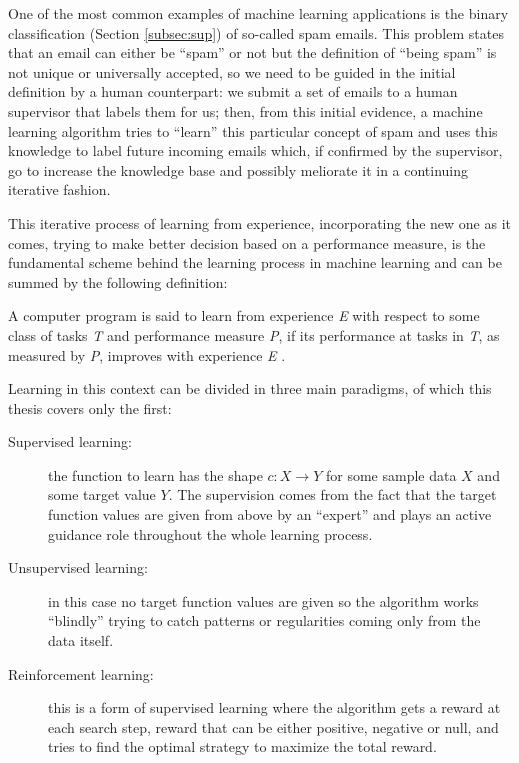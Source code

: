 One of the most common examples of machine learning applications is the binary
classification (Section \ref{subsec:sup}) of so-called spam emails.
This problem states that an email can either be ``spam'' or not but the definition
of ``being spam'' is not unique or universally accepted, so we need to be guided
in the initial definition by a human counterpart: we submit a set of emails to a
human supervisor that labels them for us; then, from this initial evidence, a
machine learning algorithm tries to ``learn'' this particular concept of spam
and uses this knowledge to label future incoming emails which, if confirmed by the
supervisor, go to increase the knowledge base and possibly meliorate it in
a continuing iterative fashion.

This iterative process of learning from experience, incorporating the new one
as it comes, trying to make better decision based on a performance measure, is
the fundamental scheme behind the learning process in machine learning and can
be summed by the following definition:

\begin{definition}[Learning]
    A computer program is said to learn from experience \emph{E} with
    respect to some class of tasks \emph{T} and performance measure \emph{P},
    if its performance at tasks in \emph{T}, as measured by \emph{P}, improves
    with experience \emph{E} \cite{ML}.
\end{definition}

Learning in this context can be divided in three main paradigms, of which this
thesis covers only the first:
\begin{description}
    \item [Supervised learning:] the function to learn has the shape
    $c: X \to Y$ for some sample data $X$ and some target value $Y$.
    The supervision comes from the fact that the target function values are
    given from above by an ``expert'' and plays an active guidance role throughout
    the whole learning process.
    \item [Unsupervised learning:] in this case no target function values are
        given so the algorithm works ``blindly'' trying to catch patterns or
        regularities coming only from the data itself.
    \item [Reinforcement learning:] this is a form of supervised learning
        where the algorithm gets a reward at each search step, reward that can
        be either positive, negative or null, and tries to find the optimal
        strategy to maximize the total reward.
\end{description}

